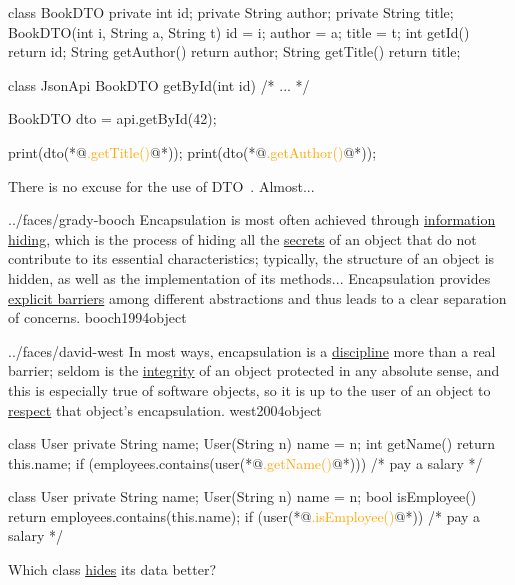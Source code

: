\documentclass{article}
\begin{document}
\begin{pptWide}{2}
{\small\begin{ffcode}
class BookDTO {
  private int id;
  private String author;
  private String title;
  BookDTO(int i, String a, String t)
    { id = i; author = a; title = t; }
  int getId() { return id; }
  String getAuthor() { return author; }
  String getTitle() { return title; }
}
\end{ffcode}
}
\par\columnbreak\par
{\small\begin{ffcode}
class JsonApi {
  BookDTO getById(int id) { /* ... */ }
}

BookDTO dto = api.getById(42);

print(dto(*@\textcolor{orange}{.getTitle()}@*));
print(dto(*@\textcolor{orange}{.getAuthor()}@*));
\end{ffcode}
}
\end{pptWide}
\par
There is no excuse for the use of DTO~\citep{bugayenko2016blog0706}. Almost...
\plush{}


\qte
  {../faces/grady-booch}
  {Encapsulation is most often achieved through \ul{information hiding}, which is the process of hiding all the \ul{secrets} of an object that do not contribute to its essential characteristics; typically, the structure of an object is hidden, as well as the implementation of its methods... Encapsulation provides \ul{explicit barriers} among different abstractions and thus leads to a clear separation of concerns.}
  {booch1994object}

\qte
  {../faces/david-west}
  {In most ways, encapsulation is a \ul{discipline} more than a real barrier; seldom is the \ul{integrity} of an object protected in any absolute sense, and this is especially true of software objects, so it is up to the user of an object to \ul{respect} that object's encapsulation.}
  {west2004object}

\begin{pptWide}{2}
{\small\begin{ffcode}
class User {
  private String name;
  User(String n) { name = n; }
  int getName() {
    return this.name;
  }
}
if (employees.contains(user(*@\textcolor{orange}{.getName()}@*))) {
  /* pay a salary */
}
\end{ffcode}
}
\par\columnbreak\par
{\small\begin{ffcode}
class User {
  private String name;
  User(String n) { name = n; }
  bool isEmployee() {
    return employees.contains(this.name);
  }
}
if (user(*@\textcolor{orange}{.isEmployee()}@*)) {
  /* pay a salary */
}
\end{ffcode}
}
\end{pptWide}
\par
Which class \ul{hides} its data better?
\plush{}
\end{document}
